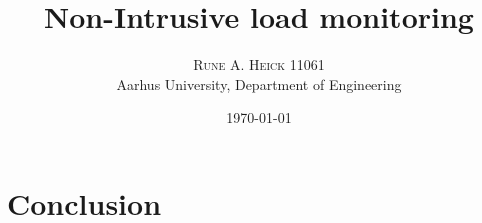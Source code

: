 


\title{\vspace{-15mm}\fontsize{24pt}{10pt}\selectfont\textbf{Non-Intrusive load monitoring}} %

\author{
\large
\textsc{Rune A. Heick 11061}\\[2mm] %
\normalsize Aarhus University, Department of Engineering \\ %
\vspace{-5mm}
}
\date{\today}

\makeglossaries

\setlength{\abovedisplayskip}{1cm}
\setlength{\belowdisplayskip}{.8cm}
\maketitle %
\newpage\null\thispagestyle{empty}\newpage
\setcounter{page}{1}
\begin{abstract}
\lipsum[7] %
\end{abstract}

\printglossary[type=\acronymtype,title=Abbreviations]
\newpage
\listoffigures
\listoftables
\newpage
\tableofcontents


\glsresetall


\glsresetall 


\glsresetall
 

\glsresetall
 

\glsresetall


\glsresetall


\glsresetall


\glsresetall
\chapter{Conclusion}
\begingroup
	\raggedright
	
\endgroup

